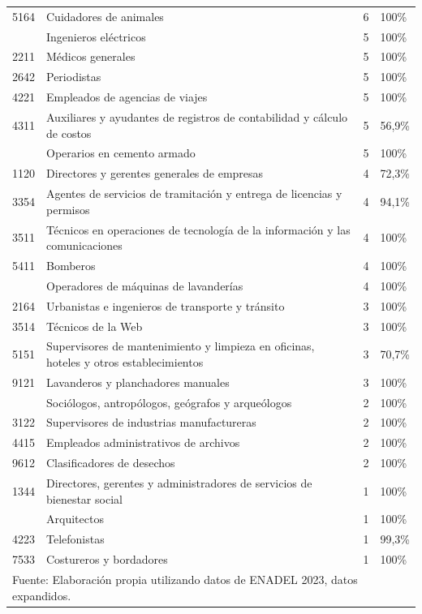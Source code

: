 \documentclass[
  11pt,
]{article}
\begin{document}
\begin{longtable}{r>{\raggedright\arraybackslash}p{9cm}rl}
5164 & Cuidadores de animales & 6 & 100\%\\
\addlinespace
2151 & Ingenieros eléctricos & 5 & 100\%\\
2211 & Médicos generales & 5 & 100\%\\
2642 & Periodistas & 5 & 100\%\\
4221 & Empleados de agencias de viajes & 5 & 100\%\\
4311 & Auxiliares y ayudantes de registros de contabilidad y cálculo de costos & 5 & 56,9\%\\
\addlinespace
7114 & Operarios en cemento armado & 5 & 100\%\\
1120 & Directores y gerentes generales de empresas & 4 & 72,3\%\\
3354 & Agentes de servicios de tramitación y entrega de licencias y permisos & 4 & 94,1\%\\
3511 & Técnicos en operaciones de tecnología de la información y las comunicaciones & 4 & 100\%\\
5411 & Bomberos & 4 & 100\%\\
\addlinespace
8157 & Operadores de máquinas de lavanderías & 4 & 100\%\\
2164 & Urbanistas e ingenieros de transporte y tránsito & 3 & 100\%\\
3514 & Técnicos de la Web & 3 & 100\%\\
5151 & Supervisores de mantenimiento y limpieza en oficinas, hoteles y otros establecimientos & 3 & 70,7\%\\
9121 & Lavanderos y planchadores manuales & 3 & 100\%\\
\addlinespace
2632 & Sociólogos, antropólogos, geógrafos y arqueólogos & 2 & 100\%\\
3122 & Supervisores de industrias manufactureras & 2 & 100\%\\
4415 & Empleados administrativos de archivos & 2 & 100\%\\
9612 & Clasificadores de desechos & 2 & 100\%\\
1344 & Directores, gerentes y administradores de servicios de bienestar social & 1 & 100\%\\
\addlinespace
2161 & Arquitectos & 1 & 100\%\\
4223 & Telefonistas & 1 & 99,3\%\\
7533 & Costureros y bordadores & 1 & 100\%\\
\bottomrule
\multicolumn{4}{l}{\rule{0pt}{1em}Fuente: Elaboración propia utilizando datos de ENADEL 2023, datos expandidos.}\\

\end{longtable}

\newpage

\end{document}
